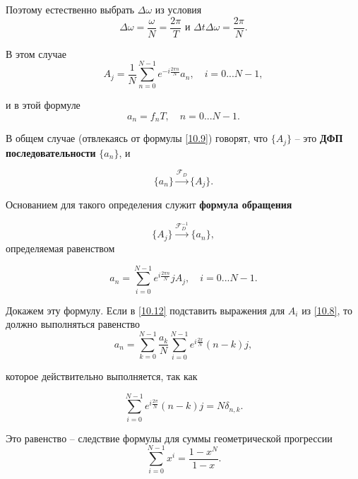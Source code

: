 Поэтому естественно выбрать $\Delta \omega$ из условия
\begin{equation}\label{10.7}
\Delta \omega = \frac{\omega}{N} = \frac{2\pi}{T} \text{ и } \Delta t \Delta \omega = \frac{2\pi}{N}.
\end{equation}

В этом случае
\begin{equation}\label{10.8}
A_j = \frac{1}{N}\sum_{n = 0}^{N - 1} e^{-i \frac{2\pi n}{N}} a_n, \quad i = 0 ... N - 1,
\end{equation}

и в этой формуле
\begin{equation}\label{10.9}
a_n = f_n T, \quad n = 0 ... N-1.
\end{equation}

В общем случае (отвлекаясь от формулы \ref{10.9}) говорят, что $\{A_j\}$ -- это \textbf{ДФП последовательности} $\{a_n\}$, и 

\begin{equation}\label{10.10}
\{a_n\} \xrightarrow{\mathscr{F}_D} \{A_j\}.
\end{equation}

Основанием для такого определения служит \textbf{формула обращения}

\begin{equation}\label{10.11}
 \{A_j\}\xrightarrow{\mathscr{F}^{-1}_D} \{a_n\} ,
\end{equation}
определяемая равенством

\begin{equation}\label{10.12}
a_n = \sum_{i = 0}^{N - 1} e^{i \frac{2\pi n}{N}} j A_j, \quad i = 0 ... N - 1.
\end{equation}

Докажем эту формулу. Если в \ref{10.12} подставить выражения для $A_i$ из \ref{10.8}, то должно выполняться равенство
\begin{equation}\label{10.13}
a_n = \sum_{k = 0}^{N - 1} \frac{a_k}{N} \sum_{i = 0}^{N - 1} e^{i \frac{2\pi }{N}}(n-k) j,
\end{equation}

которое действительно выполняется, так как

\begin{equation}\label{10.14}
\sum_{i = 0}^{N - 1} e^{i \frac{2\pi }{N}}(n-k) j = N\delta_{n,k}.
\end{equation}

Это равенство -- следствие формулы для суммы геометрической прогрессии
\begin{equation}\label{10.15}
\sum_{i = 0}^{N - 1} x^i = \frac{1-x^N}{1-x}.
\end{equation}

